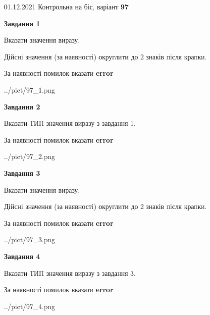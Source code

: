\documentclass[11pt, ukrainian]{article}
\begin{document}
{01.12.2021 Контрольна на біс, варіант  \No \textbf { 97 }\par}
{
\begin {large}
{\begin {center}\textbf{Завдання 1}\end {center}}\par
Вказати значення виразу. \par
Дійсні значення (за наявності) округлити до 2 знаків після крапки. \par
За наявності помилок вказати \textbf{error}

\begin{center}
	{../pict/97_1.png}
\end{center}
\newpage

{\begin {center}\textbf{Завдання 2}\end {center}}\par
Вказати ТИП значення виразу з завдання 1. \par
За наявності помилок вказати \textbf{error}

\begin{center}
	{../pict/97_2.png}
\end{center}
\newpage

{\begin {center}\textbf{Завдання 3}\end {center}}\par
Вказати значення виразу. \par
Дійсні значення (за наявності) округлити до 2 знаків після крапки. \par
За наявності помилок вказати \textbf{error}

\begin{center}
	{../pict/97_3.png}
\end{center}
\newpage

{\begin {center}\textbf{Завдання 4}\end {center}}\par
Вказати ТИП значення виразу з завдання 3. \par
За наявності помилок вказати \textbf{error}

\begin{center}
	{../pict/97_4.png}
\end{center}
\newpage


\end{large}}
\end{document}
